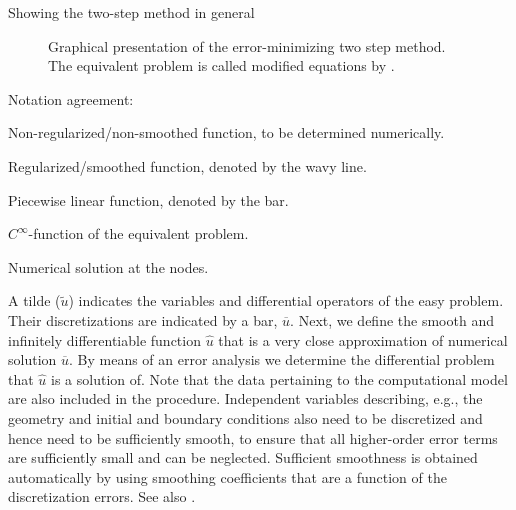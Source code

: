 Showing the two-step method in general
%
\begin{figure}[H]
        \def\svgwidth{1.0\textwidth} %
        \resizebox{1.0\textwidth}{!}{
            
        }
    \caption{Graphical presentation of the error-minimizing two step method. \newline
        The equivalent problem is called modified equations by \citet{Whitham1999, LeVeque2002}.}\label{fig:two_step_method}
\end{figure}
%
Notation agreement:
\begin{symbollist}
    \item[$u$] Non-regularized/non-smoothed function, to be determined numerically.
    \item[$\widetilde u$] Regularized/smoothed function, denoted by the wavy line.
    \item[$\overline u$] Piecewise linear function, denoted by the bar.
    \item[$\widehat u$] $C^{\infty}$-function of the equivalent problem.
    \item[$u_{i}$] Numerical solution at the nodes.
\end{symbollist}
%
A tilde ($\widetilde u$) indicates the variables and differential operators of the easy
problem.
Their discretizations are indicated by a bar, $\overline {u}$.
Next, we define the smooth and infinitely differentiable function $\widehat u$ that is a very close approximation of numerical solution $\overline {u}$.
By means of an error analysis we determine the differential problem that $\widehat u$ is a solution of.
Note that the data pertaining to the computational model are also included in the procedure.
Independent variables describing, e.g., the geometry and initial and boundary conditions also need to be discretized and hence need to be sufficiently smooth, to ensure that all higher-order error terms are sufficiently small and can be neglected.
Sufficient smoothness is obtained automatically by using smoothing coefficients that are a function of the discretization errors.
See also \citet{Borsboom2001}.

